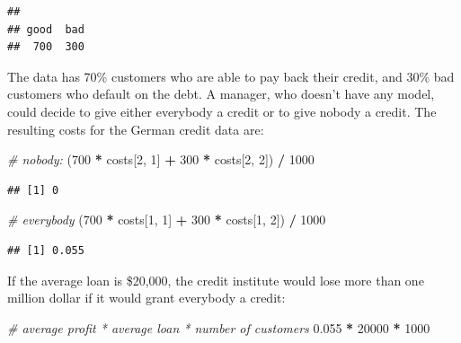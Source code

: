 \documentclass[]{scrbook}
\newenvironment{Shaded}{\begin{snugshade}}{\end{snugshade}}
\newcommand{\CommentTok}[1]{\textcolor[rgb]{0.56,0.35,0.01}{\textit{#1}}}
\newcommand{\DecValTok}[1]{\textcolor[rgb]{0.00,0.00,0.81}{#1}}
\newcommand{\FloatTok}[1]{\textcolor[rgb]{0.00,0.00,0.81}{#1}}
\newcommand{\NormalTok}[1]{#1}
\newcommand{\OperatorTok}[1]{\textcolor[rgb]{0.81,0.36,0.00}{\textbf{#1}}}
\newcommand{\StringTok}[1]{\textcolor[rgb]{0.31,0.60,0.02}{#1}}
\renewenvironment{Shaded} {\begin{snugshade}\small} {\end{snugshade}}
\begin{document}
\begin{verbatim}
## 
## good  bad 
##  700  300
\end{verbatim}

The data has 70\% customers who are able to pay back their credit, and 30\% bad customers who default on the debt.
A manager, who doesn't have any model, could decide to give either everybody a credit or to give nobody a credit.
The resulting costs for the German credit data are:

\begin{Shaded}
\begin{Highlighting}[]
\CommentTok{# nobody:}
\NormalTok{(}\DecValTok{700} \OperatorTok{*}\StringTok{ }\NormalTok{costs[}\DecValTok{2}\NormalTok{, }\DecValTok{1}\NormalTok{] }\OperatorTok{+}\StringTok{ }\DecValTok{300} \OperatorTok{*}\StringTok{ }\NormalTok{costs[}\DecValTok{2}\NormalTok{, }\DecValTok{2}\NormalTok{]) }\OperatorTok{/}\StringTok{ }\DecValTok{1000}
\end{Highlighting}
\end{Shaded}

\begin{verbatim}
## [1] 0
\end{verbatim}

\begin{Shaded}
\begin{Highlighting}[]
\CommentTok{# everybody}
\NormalTok{(}\DecValTok{700} \OperatorTok{*}\StringTok{ }\NormalTok{costs[}\DecValTok{1}\NormalTok{, }\DecValTok{1}\NormalTok{] }\OperatorTok{+}\StringTok{ }\DecValTok{300} \OperatorTok{*}\StringTok{ }\NormalTok{costs[}\DecValTok{1}\NormalTok{, }\DecValTok{2}\NormalTok{]) }\OperatorTok{/}\StringTok{ }\DecValTok{1000}
\end{Highlighting}
\end{Shaded}

\begin{verbatim}
## [1] 0.055
\end{verbatim}

If the average loan is \$20,000, the credit institute would lose more than one million dollar if it would grant everybody a credit:

\begin{Shaded}
\begin{Highlighting}[]
\CommentTok{# average profit * average loan * number of customers}
\FloatTok{0.055} \OperatorTok{*}\StringTok{ }\DecValTok{20000} \OperatorTok{*}\StringTok{ }\DecValTok{1000}
\end{Highlighting}
\end{Shaded}
\end{document}
